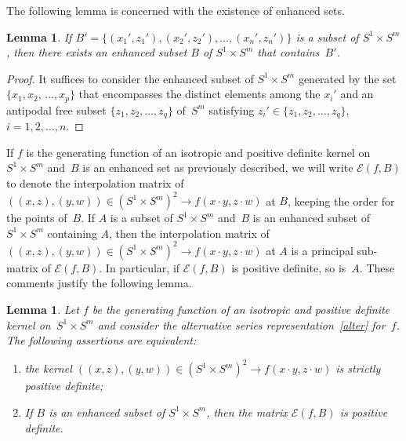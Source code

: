 \documentclass[11pt]{article}
\numberwithin{equation}{section}
\newtheorem{Lemma}[Theorem]{Lemma}
\begin{document}
The following lemma is concerned with the existence of enhanced sets.

\begin{Lemma} \label{key1Lemma} If $B'=\{(x_1',z_1'),(x_2',z_2'), \ldots, (x_n',z_n')\}$ is a subset of $S^1 \times S^m$, then there exists an enhanced subset $B$ of $S^1 \times S^m$ that contains~$B'$.
\end{Lemma}
\begin{proof}
It suf\/f\/ices to consider the enhanced subset of $S^1 \times S^m$ generated by the set $\{x_1,x_2$, $\ldots, x_p\}$ that encompasses the distinct elements among the $x_i'$ and an antipodal free subset $\{z_1,z_2, \ldots, z_q\}$ of~$S^m$ satisfying $z_i' \in \{z_1,z_2, \ldots, z_q\}$, $i=1,2,\ldots,n$.
\end{proof}

If $f$ is the generating function of an isotropic and positive def\/inite kernel on $S^1 \times S^m$ and~$B$ is an enhanced set as previously described, we will write $\mathcal{E}(f,B)$ to denote the interpolation matrix of $((x,z), (y,w)) \in (S^1 \times S^m)^2 \to f(x \cdot y, z \cdot w)$ at $B$, keeping the order for the points of~$B$. If $A$ is a subset of $S^1 \times S^m$ and~$B$ is an enhanced subset of $S^1 \times S^m$ containing $A$, then the interpolation matrix of $((x,z), (y,w)) \in (S^1 \times S^m)^2 \to f(x \cdot y, z \cdot w)$ at $A$ is a principal sub-matrix of $\mathcal{E}(f,B)$. In particular, if $\mathcal{E}(f,B)$ is positive def\/inite, so is~$A$. These comments justify the following lemma.

\begin{Lemma}\label{augmentation}
Let $f$ be the generating function of an isotropic and positive definite kernel on~\mbox{$S^1 \times S^m$} and consider the alternative series representation~\eqref{alter} for~$f$. The following assertions are equivalent:
\begin{enumerate}\itemsep=0pt
\item[$(i)$] the kernel $((x,z), (y,w)) \in (S^1 \times S^m)^2 \to f(x \cdot y, z \cdot w)$ is strictly positive definite;
\item[$(ii)$] If $B$ is an enhanced subset of $S^1 \times S^m$, then the matrix $\mathcal{E}(f,B)$ is positive definite.
\end{enumerate}
\end{Lemma}
\end{document}
